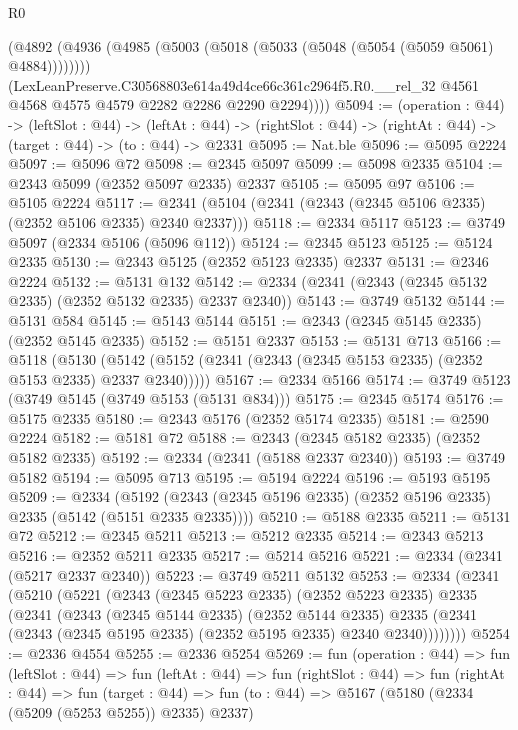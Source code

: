 \begin{lexlean}{R0}
\begin{coremodule}
          (@4892 (@4936 (@4985 (@5003 (@5018 (@5033 (@5048 (@5054 (@5059 @5061) @4884))))))))
          (LexLeanPreserve.C30568803e614a49d4ce66c361c2964f5.R0.__rel_32
            @4561
            @4568
            @4575
            @4579
            @2282
            @2286
            @2290
            @2294))))
@5094 := (operation : @44) ->
  (leftSlot : @44) ->
  (leftAt : @44) -> (rightSlot : @44) -> (rightAt : @44) -> (target : @44) -> (to : @44) -> @2331
@5095 := Nat.ble
@5096 := @5095 @2224
@5097 := @5096 @72
@5098 := @2345 @5097
@5099 := @5098 @2335
@5104 := @2343 @5099 (@2352 @5097 @2335) @2337
@5105 := @5095 @97
@5106 := @5105 @2224
@5117 := @2341 (@5104 (@2341 (@2343 (@2345 @5106 @2335) (@2352 @5106 @2335) @2340 @2337)))
@5118 := @2334 @5117
@5123 := @3749 @5097 (@2334 @5106 (@5096 @112))
@5124 := @2345 @5123
@5125 := @5124 @2335
@5130 := @2343 @5125 (@2352 @5123 @2335) @2337
@5131 := @2346 @2224
@5132 := @5131 @132
@5142 := @2334 (@2341 (@2343 (@2345 @5132 @2335) (@2352 @5132 @2335) @2337 @2340))
@5143 := @3749 @5132
@5144 := @5131 @584
@5145 := @5143 @5144
@5151 := @2343 (@2345 @5145 @2335) (@2352 @5145 @2335)
@5152 := @5151 @2337
@5153 := @5131 @713
@5166 := @5118
    (@5130 (@5142 (@5152 (@2341 (@2343 (@2345 @5153 @2335) (@2352 @5153 @2335) @2337 @2340)))))
@5167 := @2334 @5166
@5174 := @3749 @5123 (@3749 @5145 (@3749 @5153 (@5131 @834)))
@5175 := @2345 @5174
@5176 := @5175 @2335
@5180 := @2343 @5176 (@2352 @5174 @2335)
@5181 := @2590 @2224
@5182 := @5181 @72
@5188 := @2343 (@2345 @5182 @2335) (@2352 @5182 @2335)
@5192 := @2334 (@2341 (@5188 @2337 @2340))
@5193 := @3749 @5182
@5194 := @5095 @713
@5195 := @5194 @2224
@5196 := @5193 @5195
@5209 := @2334
    (@5192 (@2343 (@2345 @5196 @2335) (@2352 @5196 @2335) @2335 (@5142 (@5151 @2335 @2335))))
@5210 := @5188 @2335
@5211 := @5131 @72
@5212 := @2345 @5211
@5213 := @5212 @2335
@5214 := @2343 @5213
@5216 := @2352 @5211 @2335
@5217 := @5214 @5216
@5221 := @2334 (@2341 (@5217 @2337 @2340))
@5223 := @3749 @5211 @5132
@5253 := @2334
    (@2341
      (@5210
        (@5221
          (@2343
            (@2345 @5223 @2335)
            (@2352 @5223 @2335)
            @2335
            (@2341
              (@2343
                (@2345 @5144 @2335)
                (@2352 @5144 @2335)
                @2335
                (@2341 (@2343 (@2345 @5195 @2335) (@2352 @5195 @2335) @2340 @2340))))))))
@5254 := @2336 @4554
@5255 := @2336 @5254
@5269 := fun (operation : @44) =>
  fun (leftSlot : @44) =>
  fun (leftAt : @44) =>
  fun (rightSlot : @44) =>
  fun (rightAt : @44) =>
  fun (target : @44) => fun (to : @44) => @5167 (@5180 (@2334 (@5209 (@5253 @5255)) @2335) @2337)

\end{coremodule}
\end{lexlean}
